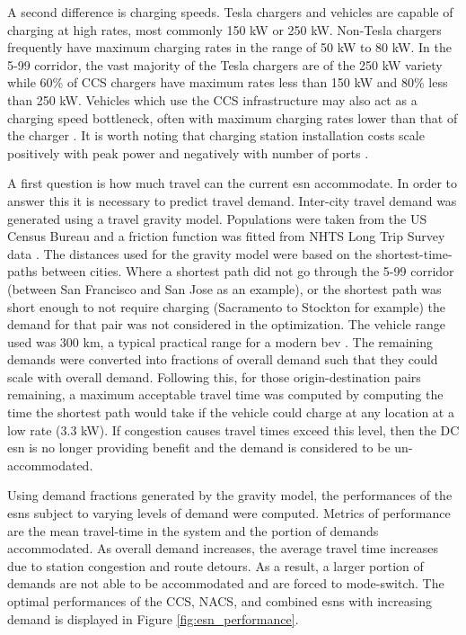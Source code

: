 A second difference is charging speeds. Tesla chargers and vehicles are capable of charging at high rates, most commonly 150 kW or 250 kW. Non-Tesla chargers frequently have maximum charging rates in the range of 50 kW to 80 kW. In the 5-99 corridor, the vast majority of the Tesla chargers are of the 250 kW variety while 60\% of CCS chargers have maximum rates less than 150 kW and 80\% less than 250 kW. Vehicles which use the CCS infrastructure may also act as a charging speed bottleneck, often with maximum charging rates lower than that of the charger \citep{AFDC_EVs_2023}. It is worth noting that charging station installation costs scale positively with peak power and negatively with number of ports \citep{Nicholas_2019}. 

A first question is how much travel can the current \gls{esn} accommodate. In order to answer this it is necessary to predict travel demand. Inter-city travel demand was generated using a travel gravity model. Populations were taken from the US Census Bureau \citep{uscb_2023_doc} and a friction function was fitted from NHTS Long Trip Survey data \citep{fhwa_2022}. The distances used for the gravity model were based on the shortest-time-paths between cities. Where a shortest path did not go through the 5-99 corridor (between San Francisco and San Jose as an example), or the shortest path was short enough to not require charging (Sacramento to Stockton for example) the demand for that pair was not considered in the optimization. The vehicle range used was 300 km, a typical practical range for a modern \gls{bev} \cite{ev_database_2025_range}. The remaining demands were converted into fractions of overall demand such that they could scale with overall demand. Following this, for those origin-destination pairs remaining, a maximum acceptable travel time was computed by computing the time the shortest path would take if the vehicle could charge at any location at a low rate (3.3 kW). If congestion causes travel times exceed this level, then the DC \gls{esn} is no longer providing benefit and the demand is considered to be un-accommodated.

Using demand fractions generated by the gravity model, the performances of the \glspl{esn} subject to varying levels of demand were computed. Metrics of performance are the mean travel-time in the system and the portion of demands accommodated. As overall demand increases, the average travel time increases due to station congestion and route detours. As a result, a larger portion of demands are not able to be accommodated and are forced to mode-switch. The optimal performances of the CCS, NACS, and combined \glspl{esn} with increasing demand is displayed in Figure \ref{fig:esn_performance}.

